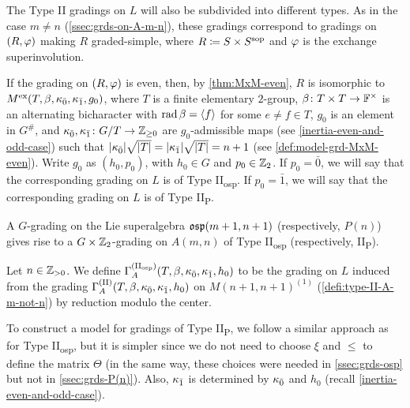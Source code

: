 The Type II gradings on $L$ will also be subdivided into different types. 
As in the case $m\neq n$ (\cref{ssec:grds-on-A-m-n}), these gradings correspond to gradings on $(R, \varphi)$ making $R$ graded-simple, where $R \coloneqq S \times S^{\mathrm{sop}}$ and $\varphi$ is the exchange superinvolution. 

If the grading on $(R,\varphi)$ is even, then, by \cref{thm:MxM-even}, $R$ is isomorphic to $M^{\mathrm{ex}} (T, \beta, \kappa_{\bar{0}}, \kappa_{\bar{1}}, g_0)$, where $T$ is a finite elementary $2$-group, $\beta\colon {T\times T} \to \mathbb{F}^\times$ is an alternating bicharacter with $\operatorname{rad} \beta = \langle f \rangle$ for some $e \neq f \in T$, $g_0$ is an element in $G^\#$, and $\kappa_{\bar{0}}, \kappa_{\bar{1}} \colon G/T \to \mathbb{Z}_{\geq 0}$ are $g_0$-admissible maps (see \cref{inertia-even-and-odd-case}) such that $|\kappa_{\bar{0}}| \sqrt{|T|} = |\kappa_{\bar{1}}| \sqrt{|T|} = n+1$ (see \cref{def:model-grd-MxM-even}). 
Write $g_0$ as $(h_0, p_0)$, with $h_0 \in G$ and $p_0 \in \mathbb{Z}_2$. 
If $p_0 = \bar 0$, we will say that the corresponding grading on $L$ is of Type II\textsubscript{osp}. 
If $p_0 = \bar 1$, we will say that the corresponding grading on $L$ is of Type II\textsubscript{P}. 

\begin{remark}
    A $G$-grading on the Lie superalgebra $\mathfrak{osp}(m+1,n+1)$ (respectively, $P(n)$) gives rise to a $G \times \mathbb{Z}_2$-grading on $A(m,n)$ of Type II\textsubscript{osp} (respectively, II\textsubscript{P}). 
\end{remark}

\begin{defi}\label{def:type-II-osp}
    Let $n\in \mathbb{Z}_{> 0}$. 
    We define $\Gamma^{\mathrm{(II_{osp})}}_A(T, \beta, \kappa_{\bar{0}}, \kappa_{\bar{1}}, h_0)$ to be the grading on $L$ induced from the grading $\Gamma^{\mathrm{(II)}}_A(T, \beta, \kappa_{\bar{0}}, \kappa_{\bar{1}}, h_0)$ on $M(n+1, n+1)^{(1)}$ (\cref{defi:type-II-A-m-not-n}) by reduction modulo the center.
\end{defi}

To construct a model for gradings of Type II\textsubscript{P}, we follow a similar approach as for Type II\textsubscript{osp}, but it is simpler since we do not need to choose $\xi$ and $\leq$ to define the matrix $\Theta$ (in the same way, these choices were needed in \cref{ssec:grds-osp} but not in \cref{ssec:grds-P(n)}). 
Also, $\kappa_{\bar{1}}$ is determined by $\kappa_{\bar{0}}$ and $h_0$ (recall \cref{inertia-even-and-odd-case}).

